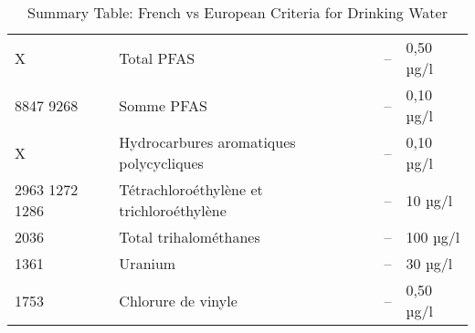 \documentclass{article}
\begin{document}
\begin{table}[h!]
\begin{tabular}{|l|l|l|l|}
X & Total PFAS & -- & 0,50 µg/l \\
8847 9268 & Somme PFAS & -- & 0,10 µg/l \\
X & Hydrocarbures aromatiques polycycliques & -- & 0,10 µg/l \\
2963 1272 1286 & Tétrachloroéthylène et trichloroéthylène & -- & 10 µg/l \\
2036 & Total trihalométhanes & -- & 100 µg/l \\
1361 & Uranium & -- & 30 µg/l \\
1753 & Chlorure de vinyle & -- & 0,50 µg/l \\
\hline
\end{tabular}
\caption{Summary Table: French vs European Criteria for Drinking Water}
\end{table}
\end{document}
